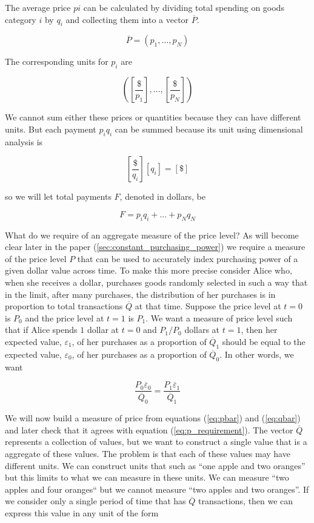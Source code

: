 The average price $pi$ can be calculated by dividing total spending on goods category $i$ by $q_i$
and collecting them into a vector $\overline P$.

\begin{equation} \label{eq:pbar}
    \overline P = \left( p_1, \dots, p_N \right)
\end{equation}

The corresponding units for $p_i$ are

\[ \left( \left[ \frac {\$} {p_1} \right], \dots, \left[ \frac {\$} {p_N} \right] \right) \]

We cannot sum either these prices or quantities because they can have different units. But each
payment $p_i q_i$ can be summed because its unit using dimensional analysis is

\[ \left[ \frac {\$} {q_i} \right] \left[ q_i \right] = \left[ \$ \right] \]

so we will let total payments $F$, denoted in dollars, be

\[ F = p_i q_i + \dots + p_N q_N \]

What do we require of an aggregate measure of the price level? As will become clear later in the
paper (\ref{sec:constant_purchasing_power}) we require a measure of the price level $P$ that can be
used to accurately index purchasing power of a given dollar value across time. To make this more
precise consider Alice who, when she receives a dollar, purchases goods randomly selected in such a
way that in the limit, after many purchases, the distribution of her purchases is in proportion to
total transactions $\overline Q$ at that time. Suppose the price level at $t=0$ is $P_0$ and the
price level at $t=1$ is $P_1$. We want a measure of price level such that if Alice spends $1$ dollar
at $t=0$ and $P_1 / P_0$ dollars at $t=1$, then her expected value, $\varepsilon_1$, of her purchases as
a proportion of $\overline Q_1$ should be equal to the expected value, $\varepsilon_0$, of her
purchases as a proportion of $\overline Q_0$. In other words, we want

\begin{equation} \label{eq:p_requirement}
    \frac {P_0 \overline \varepsilon_0} {\overline Q_0} = \frac {P_1 \overline \varepsilon_1} {\overline Q_1}
\end{equation}

We will now build a measure of price from equations (\ref{eq:pbar}) and (\ref{eq:qbar}) and later
check that it agrees with equation (\ref{eq:p_requirement}). The vector $\overline Q$ represents a
collection of values, but we want to construct a single value that is a aggregate of these values.
The problem is that each of these values may have different units. We can construct units that such
as ``one apple and two oranges'' but this limits to what we can measure in these units. We can
measure ``two apples and four oranges`` but we cannot measure ``two apples and two oranges''. If we
consider only a single period of time that has $\overline Q$ transactions, then we can express
this value in any unit of the form

